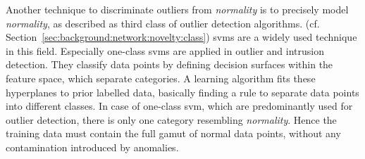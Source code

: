 Another technique to discriminate outliers from \emph{normality} is to precisely model \emph{normality}, as \textcite{Hodge2004} described as third class of outlier detection algorithms. (cf. Section~\ref{sec:background:network:novelty:class})
\glspl{svm} are a widely used technique in this field. Especially one-class \glspl{svm} are applied in outlier and intrusion detection. \parencite[cf.][]{Lazarevic2003,Eskin2002}
They classify data points by defining decision surfaces within the feature space, which separate categories. A learning algorithm fits these hyperplanes to prior labelled data, basically finding a rule to separate data points into different classes. 
In case of one-class \gls{svm}, which are predominantly used for outlier detection, there is only one category resembling \emph{normality}. Hence the training data must contain the full gamut of normal data points, without any contamination introduced by anomalies. \parencite[cf.][]{Muller2001,Scholkopf2001a}

